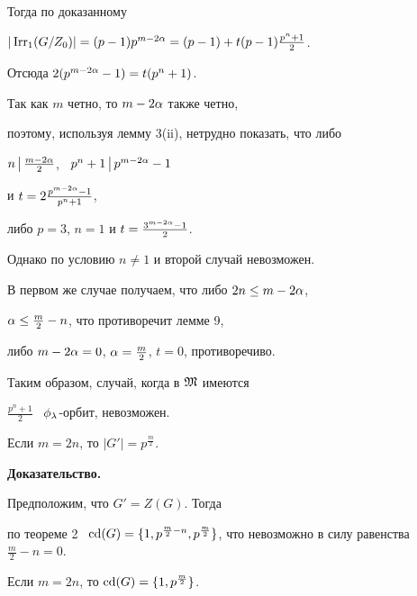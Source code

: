 Тогда по доказанному


$|\operatorname{Irr_1}(G/Z_0)|=(p-1)p^{m-2\alpha}=(p-1)+t(p-1)\frac{p^n+1}{2}$.


Отсюда $2(p^{m-2\alpha}-1)=t(p^n+1)$.


Так как $m$ четно, то $m-2\alpha$ также четно,


поэтому, используя лемму 3\;(ii), нетрудно показать, что либо 


$n\,\big|\,\frac{m-2\alpha}{2}$, \ $p^n+1\,\big|\,p^{m-2\alpha}-1$


и $t=2\frac{p^{m-2\alpha}-1}{p^n+1}$, 


либо $p=3$, $n=1$ и $t=\frac{3^{m-2\alpha}-1}{2}$.


Однако по условию $n\ne1$ и второй случай невозможен.


В первом же случае получаем, что либо $2n\le m-2\alpha$, 


$\alpha\le\frac m2-n$, что противоречит лемме 9,


либо $m-2\alpha=0$, $\alpha=\frac m2$, $t=0$, противоречиво.





Таким образом, случай, когда в $\frak M$ имеются


$\frac{p^n+1}{2}$ \ $\phi_\lambda$-орбит, невозможен.








\begin{cornonum}


Если $m=2n$, то $|G'|=p^{\frac m2}$.


\end{cornonum}








{\bf Доказательство.}


Предположим, что $G'=Z(G)$. Тогда


по теореме 2 \ $\cdeg(G)=\lbr1,p^{\frac m2-n},


p^{\frac m2}\rbr$, что невозможно в силу равенства $\frac m2-n=0$.








\begin{thm}


Если $m=2n$, то $\operatorname{cd}(G)=\lbrace1,p^{\frac m2}\rbrace$.


\end{thm}








